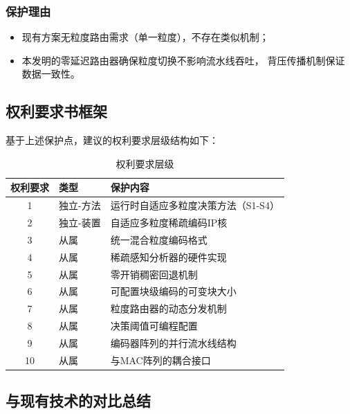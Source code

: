 \documentclass[a4paper,12pt,fontset=ubuntu]{ctexart}
\begin{document}
\subsubsection{保护理由}

\begin{itemize}
  \item 现有方案无粒度路由需求（单一粒度），不存在类似机制；
  \item 本发明的零延迟路由器确保粒度切换不影响流水线吞吐，
        背压传播机制保证数据一致性。
\end{itemize}

\subsection{权利要求书框架}

基于上述保护点，建议的权利要求层级结构如下：

\begin{table}[htbp]
\centering
\caption{权利要求层级}
\begin{tabular}{clp{8cm}}
\toprule
\textbf{权利要求} & \textbf{类型} & \textbf{保护内容} \\
\midrule
1  & 独立-方法 & 运行时自适应多粒度决策方法（S1-S4） \\
2  & 独立-装置 & 自适应多粒度稀疏编码IP核 \\
3  & 从属 & 统一混合粒度编码格式 \\
4  & 从属 & 稀疏感知分析器的硬件实现 \\
5  & 从属 & 零开销稠密回退机制 \\
6  & 从属 & 可配置块级编码的可变块大小 \\
7  & 从属 & 粒度路由器的动态分发机制 \\
8  & 从属 & 决策阈值可编程配置 \\
9  & 从属 & 编码器阵列的并行流水线结构 \\
10 & 从属 & 与MAC阵列的耦合接口 \\
\bottomrule
\end{tabular}
\end{table}

\subsection{与现有技术的对比总结}
\end{document}
